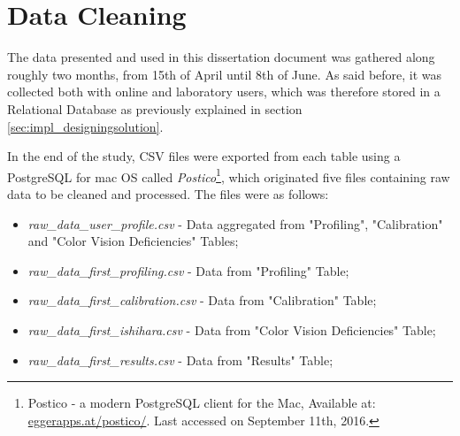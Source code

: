 \section{Data Cleaning}
\label{sec:results_datacleaning}
%
The data presented and used in this dissertation document was gathered along roughly two months, from 15th of April until 8th of June. As said before,
it was collected both with online and laboratory users, which was therefore stored in a Relational Database as previously explained in section
\ref{sec:impl_designingsolution}. \par
%
In the end of the study, \gls{CSV} files were exported from each table using a PostgreSQL for mac OS called
\emph{Postico}\footnote{Postico - a modern PostgreSQL client for the Mac, Available at: \url{eggerapps.at/postico/}. Last accessed on
September 11th, 2016.}, which originated five files containing raw data to be cleaned and processed. The files were as follows:
%
\begin{itemize}
  \item \emph{raw\_data\_user\_profile.csv} - Data aggregated from "Profiling", "Calibration" and "Color Vision Deficiencies" Tables;
  \item \emph{raw\_data\_first\_profiling.csv} - Data from "Profiling" Table;
  \item \emph{raw\_data\_first\_calibration.csv} - Data from "Calibration" Table;
  \item \emph{raw\_data\_first\_ishihara.csv} - Data from "Color Vision Deficiencies" Table;
  \item \emph{raw\_data\_first\_results.csv} - Data from "Results" Table;
\end{itemize} \par
%
